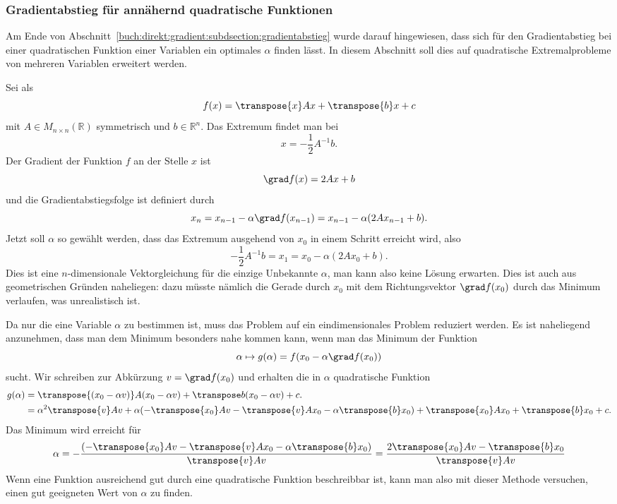 %
%
\subsubsection{Gradientabstieg für annähernd quadratische Funktionen}
Am Ende von Abschnitt~\ref{buch:direkt:gradient:subdsection:gradientabstieg}
wurde darauf hingewiesen, dass sich für den Gradientabstieg bei einer
quadratischen Funktion einer Variablen ein optimales $\alpha$ finden lässt.
In diesem Abschnitt soll dies auf quadratische Extremalprobleme von
mehreren Variablen erweitert werden.

Sei als 
\[
f(x)
=
\transpose{x}Ax+\transpose{b}x+c
\]
mit $A\in M_{n\times n}(\mathbb{R})$ symmetrisch und $b\in\mathbb{R}^n$.
Das Extremum findet man bei 
\[
x = -\frac12 A^{-1} b.
\]
Der Gradient der Funktion $f$ an der Stelle $x$ ist
\[
\grad f(x)
=
2Ax + b
\]
und die Gradientabstiegsfolge ist definiert durch
\[
x_n
=
x_{n-1} -\alpha \grad f(x_{n-1})
=
x_{n-1} - \alpha (2A x_{n-1} + b).
\]
Jetzt soll $\alpha$ so gewählt werden, dass das Extremum ausgehend von 
$x_0$ in einem Schritt erreicht wird, also
\[
-\frac12 A^{-1}b
=
x_1
=
x_0 - \alpha (2A x_0 + b).
\]
Dies ist eine $n$-dimensionale Vektorgleichung für die einzige Unbekannte
$\alpha$, man kann also keine Lösung erwarten.
Dies ist auch aus geometrischen Gründen naheliegen: dazu müsste nämlich
die Gerade durch $x_0$ mit dem Richtungsvektor $\grad f(x_0)$ durch das
Minimum verlaufen, was unrealistisch ist.

Da nur die eine Variable $\alpha$ zu bestimmen ist, muss das Problem auf
ein eindimensionales Problem reduziert werden.
Es ist naheliegend anzunehmen, dass man dem Minimum besonders nahe
kommen kann, wenn man das Minimum der Funktion
\[
\alpha
\mapsto
g(\alpha)
=
f(x_0 - \alpha\grad f(x_0))
\]
sucht.
Wir schreiben zur Abkürzung $v=\grad f(x_0)$ und erhalten
die in $\alpha$ quadratische Funktion
\begin{align*}
g(\alpha)
&=
\transpose{(x_0 - \alpha v)}A(x_0-\alpha v) + \transpose b(x_0-\alpha v) + c.
\\
&=
\alpha^2
\transpose{v}Av
+
\alpha
(-\transpose{x_0}Av -\transpose{v}Ax_0 -\alpha \transpose{b}x_0)
+
\transpose{x_0}Ax_0+\transpose{b}x_0 + c.
\end{align*}
Das Minimum wird erreicht für
\[
\alpha
=
-\frac{
(-\transpose{x_0}Av -\transpose{v}Ax_0 -\alpha \transpose{b}x_0)
}{
\transpose{v}Av
}
=
\frac{2\transpose{x_0}Av -\transpose{b}x_0}{\transpose{v}Av}
\]
Wenn eine Funktion ausreichend gut durch eine quadratische Funktion
beschreibbar ist, kann man also mit dieser Methode versuchen, einen gut
geeigneten Wert von $\alpha$ zu finden.



